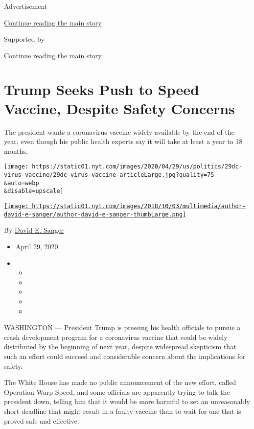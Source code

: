 Advertisement

\protect\hyperlink{after-top}{Continue reading the main story}

Supported by

\protect\hyperlink{after-sponsor}{Continue reading the main story}

\hypertarget{trump-seeks-push-to-speed-vaccine-despite-safety-concerns}{%
\section{Trump Seeks Push to Speed Vaccine, Despite Safety
Concerns}\label{trump-seeks-push-to-speed-vaccine-despite-safety-concerns}}

The president wants a coronavirus vaccine widely available by the end of
the year, even though his public health experts say it will take at
least a year to 18 months.

\texttt{[image: https://static01.nyt.com/images/2020/04/29/us/politics/29dc-virus-vaccine/29dc-virus-vaccine-articleLarge.jpg?quality=75\\\&auto=webp\\\&disable=upscale]}

\href{https://www.nytimes.com/by/david-e-sanger}{\texttt{[image: https://static01.nyt.com/images/2018/10/03/multimedia/author-david-e-sanger/author-david-e-sanger-thumbLarge.png]}}

By \href{https://www.nytimes.com/by/david-e-sanger}{David E. Sanger}

\begin{itemize}
\item
  April 29, 2020
\item
  \begin{itemize}
  \item
  \item
  \item
  \item
  \item
  \end{itemize}
\end{itemize}

WASHINGTON --- President Trump is pressing his health officials to
pursue a crash development program for a coronavirus vaccine that could
be widely distributed by the beginning of next year, despite widespread
skepticism that such an effort could succeed and considerable concern
about the implications for safety.

The White House has made no public announcement of the new effort,
called Operation Warp Speed, and some officials are apparently trying to
talk the president down, telling him that it would be more harmful to
set an unreasonably short deadline that might result in a faulty vaccine
than to wait for one that is proved safe and effective.

